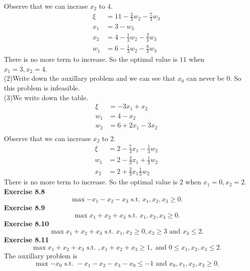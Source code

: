 \documentclass[letterpaper,12pt]{article}
\theoremstyle{definition}
\begin{document}
Observe that we can incrase $x_2$ to $4.$
\begin{align*}
  \xi &= 11 - \frac{2}{3}w_2 - \frac{7}{3}w_3 \\
  x_1 &= 3 - w_3 \\
  x_2 &= 4 - \frac{1}{3}w_2 -\frac{2}{3}w_3 \\
  w_1 &= 6 - \frac{1}{3}w_2 -\frac{8}{3}w_3
\end{align*}
There is no more term to increase. So the optimal value is $11$ when $x_1 =3, x_2 = 4.$ \\
(2)Write down the auxillary problem and we can see that $x_0$ can never be $0.$ So this problem is infeasible.  \\
(3)We write down the table.
\begin{align*}
  \xi &= -3x_1 + x_2 \\
  w_1 &= 4 - x_2 \\
  w_2 &= 6+2x_1 -3x_2 \\
\end{align*}
Observe that we can increase $x_2$ to $2.$
\begin{align*}
  \xi &= 2 - \frac{7}{3}x_1 - \frac{1}{3}w_2 \\
  w_1 &= 2 - \frac{2}{3}x_1 + \frac{1}{3}w_2 \\
  x_2 &= 2 + \frac{2}{3}x_1 \frac{1}{3}w_2
\end{align*}
There is no more term to increase. So the optimal value is $2$ when $x_1 =0, x_2 = 2.$ \\


\noindent\textbf{Exercise 8.8} \\
$$\max{-x_1-x_2-x_3} \text{ s.t. } x_1, x_2, x_3 \geq 0.$$
\noindent\textbf{Exercise 8.9} \\
$$\max{x_1+x_2+x_3} \text{ s.t. } x_1, x_2, x_3 \geq 0.$$
\noindent\textbf{Exercise 8.10} \\
$$\max{x_1+x_2+x_3} \text{ s.t. } x_1, x_2 \geq 0, x_3 \geq 3 \text{ and } x_3 \leq 2.$$
\noindent\textbf{Exercise 8.11} \\
$$\max{x_1+x_2+x_3} \text{ s.t. }, x_1 + x_2 + x_3 \geq 1, \text{ and }0 \leq x_1, x_2, x_3 \leq 2.$$
The auxillary problem is $$\max{-x_0} \text{ s.t. } -x_1 -x_2 -x_3 -x_0 \leq -1 \text{ and } x_0, x_1, x_2, x_3 \geq 0.$$
\end{document}
